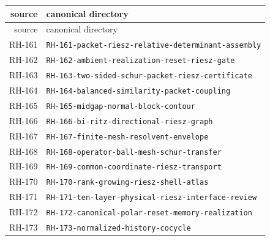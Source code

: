 \begin{longtable}{r >{\raggedright\arraybackslash}p{}}
\toprule
source & canonical directory\\
\midrule
\endfirsthead
\toprule
source & canonical directory\\
\midrule
\endhead
RH-161 & \texttt{RH-\allowbreak{}161-\allowbreak{}packet-\allowbreak{}riesz-\allowbreak{}relative-\allowbreak{}determinant-\allowbreak{}assembly}\\
RH-162 & \texttt{RH-\allowbreak{}162-\allowbreak{}ambient-\allowbreak{}realization-\allowbreak{}reset-\allowbreak{}riesz-\allowbreak{}gate}\\
RH-163 & \texttt{RH-\allowbreak{}163-\allowbreak{}two-\allowbreak{}sided-\allowbreak{}schur-\allowbreak{}packet-\allowbreak{}riesz-\allowbreak{}certificate}\\
RH-164 & \texttt{RH-\allowbreak{}164-\allowbreak{}balanced-\allowbreak{}similarity-\allowbreak{}packet-\allowbreak{}coupling}\\
RH-165 & \texttt{RH-\allowbreak{}165-\allowbreak{}midgap-\allowbreak{}normal-\allowbreak{}block-\allowbreak{}contour}\\
RH-166 & \texttt{RH-\allowbreak{}166-\allowbreak{}bi-\allowbreak{}ritz-\allowbreak{}directional-\allowbreak{}riesz-\allowbreak{}graph}\\
RH-167 & \texttt{RH-\allowbreak{}167-\allowbreak{}finite-\allowbreak{}mesh-\allowbreak{}resolvent-\allowbreak{}envelope}\\
RH-168 & \texttt{RH-\allowbreak{}168-\allowbreak{}operator-\allowbreak{}ball-\allowbreak{}mesh-\allowbreak{}schur-\allowbreak{}transfer}\\
RH-169 & \texttt{RH-\allowbreak{}169-\allowbreak{}common-\allowbreak{}coordinate-\allowbreak{}riesz-\allowbreak{}transport}\\
RH-170 & \texttt{RH-\allowbreak{}170-\allowbreak{}rank-\allowbreak{}growing-\allowbreak{}riesz-\allowbreak{}shell-\allowbreak{}atlas}\\
RH-171 & \texttt{RH-\allowbreak{}171-\allowbreak{}ten-\allowbreak{}layer-\allowbreak{}physical-\allowbreak{}riesz-\allowbreak{}interface-\allowbreak{}review}\\
RH-172 & \texttt{RH-\allowbreak{}172-\allowbreak{}canonical-\allowbreak{}polar-\allowbreak{}reset-\allowbreak{}memory-\allowbreak{}realization}\\
RH-173 & \texttt{RH-\allowbreak{}173-\allowbreak{}normalized-\allowbreak{}history-\allowbreak{}cocycle}\\

\end{longtable}
